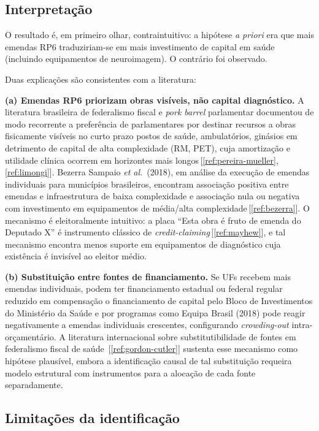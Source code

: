 \documentclass[12pt,a4paper,oneside]{article}
\begin{document}
\subsection{Interpretação}

O resultado é, em primeiro olhar, contraintuitivo: a hipótese
\textit{a priori} era que mais emendas RP6 traduziriam-se em mais
investimento de capital em saúde (incluindo equipamentos de
neuroimagem). O contrário foi observado.

Duas explicações são consistentes com a literatura:

\textbf{(a) Emendas RP6 priorizam obras visíveis, não capital
diagnóstico.} A literatura brasileira de federalismo fiscal e
\textit{pork barrel} parlamentar documentou de modo recorrente
a preferência de parlamentares por destinar recursos a obras
fisicamente visíveis no curto prazo \textemdash{} postos de saúde,
ambulatórios, ginásios \textemdash{} em detrimento de capital de
alta complexidade (RM, PET), cuja amortização e utilidade clínica
ocorrem em horizontes mais longos\,[\ref{ref:pereira-mueller},
\ref{ref:limongi}]. Bezerra Sampaio \textit{et al.}\ (2018), em
análise da execução de emendas individuais para municípios
brasileiros, encontram associação positiva entre emendas e
infraestrutura de baixa complexidade e associação nula ou
negativa com investimento em equipamentos de média/alta
complexidade\,[\ref{ref:bezerra}]. O mecanismo é eleitoralmente
intuitivo: a placa ``Esta obra é fruto de emenda do Deputado X''
é instrumento clássico de \textit{credit-claiming}\,[\ref{ref:mayhew}],
e tal mecanismo encontra menos suporte em equipamentos de
diagnóstico cuja existência é invisível ao eleitor médio.

\textbf{(b) Substituição entre fontes de financiamento.} Se UFs
recebem mais emendas individuais, podem ter financiamento
estadual ou federal regular reduzido em compensação \textemdash{}
o financiamento de capital pelo Bloco de Investimentos do
Ministério da Saúde e por programas como Equipa Brasil
(2018) pode reagir negativamente a emendas
individuais crescentes, configurando \textit{crowding-out}
intra-orçamentário. A literatura internacional sobre
substitutibilidade de fontes em federalismo fiscal de saúde
\,[\ref{ref:gordon-cutler}] sustenta esse mecanismo como
hipótese plausível, embora a identificação causal de tal
substituição requeira modelo estrutural com instrumentos para a
alocação de cada fonte separadamente.

\subsection{Limitações da identificação}
\end{document}
